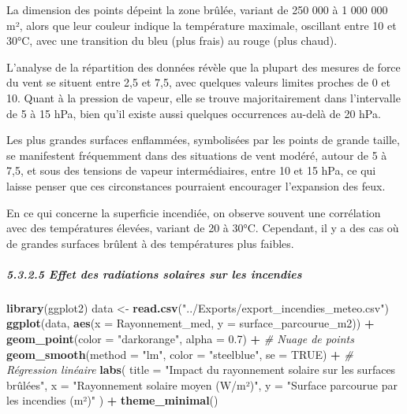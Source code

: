 \documentclass[
]{article}
\newenvironment{Shaded}{\begin{snugshade}}{\end{snugshade}}
\newcommand{\AttributeTok}[1]{\textcolor[rgb]{0.13,0.29,0.53}{#1}}
\newcommand{\CommentTok}[1]{\textcolor[rgb]{0.56,0.35,0.01}{\textit{#1}}}
\newcommand{\ConstantTok}[1]{\textcolor[rgb]{0.56,0.35,0.01}{#1}}
\newcommand{\FloatTok}[1]{\textcolor[rgb]{0.00,0.00,0.81}{#1}}
\newcommand{\FunctionTok}[1]{\textcolor[rgb]{0.13,0.29,0.53}{\textbf{#1}}}
\newcommand{\NormalTok}[1]{#1}
\newcommand{\OtherTok}[1]{\textcolor[rgb]{0.56,0.35,0.01}{#1}}
\newcommand{\SpecialCharTok}[1]{\textcolor[rgb]{0.81,0.36,0.00}{\textbf{#1}}}
\newcommand{\StringTok}[1]{\textcolor[rgb]{0.31,0.60,0.02}{#1}}
\begin{document}
La dimension des points dépeint la zone brûlée, variant de 250 000 à 1
000 000 m², alors que leur couleur indique la température maximale,
oscillant entre 10 et 30°C, avec une transition du bleu (plus frais) au
rouge (plus chaud).

L'analyse de la répartition des données révèle que la plupart des
mesures de force du vent se situent entre 2,5 et 7,5, avec quelques
valeurs limites proches de 0 et 10. Quant à la pression de vapeur, elle
se trouve majoritairement dans l'intervalle de 5 à 15 hPa, bien qu'il
existe aussi quelques occurrences au-delà de 20 hPa.

Les plus grandes surfaces enflammées, symbolisées par les points de
grande taille, se manifestent fréquemment dans des situations de vent
modéré, autour de 5 à 7,5, et sous des tensions de vapeur
intermédiaires, entre 10 et 15 hPa, ce qui laisse penser que ces
circonstances pourraient encourager l'expansion des feux.

En ce qui concerne la superficie incendiée, on observe souvent une
corrélation avec des températures élevées, variant de 20 à 30°C.
Cependant, il y a des cas où de grandes surfaces brûlent à des
températures plus faibles.

\subparagraph{5.3.2.5 Effet des radiations solaires sur les
incendies}\label{effet-des-radiations-solaires-sur-les-incendies}

\begin{Shaded}
\begin{Highlighting}[]
\FunctionTok{library}\NormalTok{(ggplot2)}
\NormalTok{data }\OtherTok{\textless{}{-}} \FunctionTok{read.csv}\NormalTok{(}\StringTok{"../Exports/export\_incendies\_meteo.csv"}\NormalTok{)}
\FunctionTok{ggplot}\NormalTok{(data, }\FunctionTok{aes}\NormalTok{(}\AttributeTok{x =}\NormalTok{ Rayonnement\_med, }\AttributeTok{y =}\NormalTok{ surface\_parcourue\_m2)) }\SpecialCharTok{+}
  \FunctionTok{geom\_point}\NormalTok{(}\AttributeTok{color =} \StringTok{"darkorange"}\NormalTok{, }\AttributeTok{alpha =} \FloatTok{0.7}\NormalTok{) }\SpecialCharTok{+}  \CommentTok{\# Nuage de points}
  \FunctionTok{geom\_smooth}\NormalTok{(}\AttributeTok{method =} \StringTok{"lm"}\NormalTok{, }\AttributeTok{color =} \StringTok{"steelblue"}\NormalTok{, }\AttributeTok{se =} \ConstantTok{TRUE}\NormalTok{) }\SpecialCharTok{+}  \CommentTok{\# Régression linéaire}
  \FunctionTok{labs}\NormalTok{(}
    \AttributeTok{title =} \StringTok{"Impact du rayonnement solaire sur les surfaces brûlées"}\NormalTok{,}
    \AttributeTok{x =} \StringTok{"Rayonnement solaire moyen (W/m²)"}\NormalTok{,}
    \AttributeTok{y =} \StringTok{"Surface parcourue par les incendies (m²)"}
\NormalTok{  ) }\SpecialCharTok{+}
  \FunctionTok{theme\_minimal}\NormalTok{()}
\end{Highlighting}
\end{Shaded}
\end{document}
